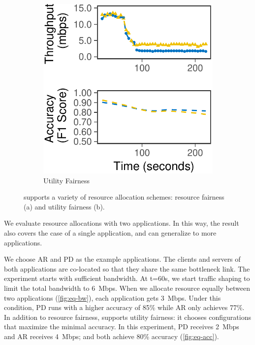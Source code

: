 \begin{figure}
\begin{subfigure}[t]{0.45\columnwidth}
    \includegraphics[width=\textwidth]{figures/multitask-right.pdf}
    \caption{Utility Fairness}
    \label{fig:eq-acc}
  \end{subfigure}
  \caption{\sysname{} supports a variety of resource allocation schemes:
    resource fairness (a) and utility fairness (b).}
  \label{fig:multitask}
  \vspace{-1em}
\end{figure}

We evaluate resource allocations with two applications. In this way, the result
also covers the case of a single application, and can generalize to more
applications.

We choose AR and PD as the example applications.  The clients and servers of
both applications are co-located so that they share the same bottleneck
link. The experiment starts with sufficient bandwidth. At t=60s, we start
traffic shaping to limit the total bandwidth to \SI{6}{Mbps}. When we allocate
resource equally between two applications (\autoref{fig:eq-bw}), each
application gets \SI{3}{Mbps}. Under this condition, PD runs with a higher
accuracy of 85\% while AR only achieves 77\%. In addition to resource fairness,
\sysname{} supports utility fairness: it chooses configurations that maximize
the minimal accuracy. In this experiment, PD receives \SI{2}{Mbps} and AR
receives \SI{4}{Mbps}; and both achieve 80\% accuracy (\autoref{fig:eq-acc}).

